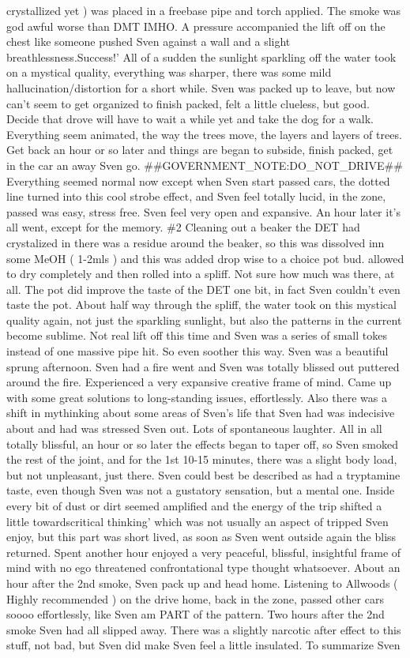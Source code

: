 \documentclass[12pt]{book}
\begin{document}
crystallized yet ) was placed in a freebase pipe and torch applied. The smoke was god awful worse than DMT IMHO. A pressure accompanied the lift off on the chest like someone pushed Sven against a wall and a slight breathlessness.Success!' All of a sudden the sunlight sparkling off the water took on a mystical quality, everything was sharper, there was some mild hallucination/distortion for a short while. Sven was packed up to leave, but now can't seem to get organized to finish packed, felt a little clueless, but good. Decide that drove will have to wait a while yet and take the dog for a walk. Everything seem animated, the way the trees move, the layers and layers of trees. Get back an hour or so later and things are began to subside, finish packed, get in the car an away Sven go. \#\#GOVERNMENT\_NOTE:DO\_NOT\_DRIVE\#\# Everything seemed normal now except when Sven start passed cars, the dotted line turned into this cool strobe effect, and Sven feel totally lucid, in the zone, passed was easy, stress free. Sven feel very open and expansive. An hour later it's all went, except for the memory. \#2 Cleaning out a beaker the DET had crystalized in there was a residue around the beaker, so this was dissolved inn some MeOH ( 1-2mls ) and this was added drop wise to a choice pot bud. allowed to dry completely and then rolled into a spliff. Not sure how much was there, at all. The pot did improve the taste of the DET one bit, in fact Sven couldn't even taste the pot. About half way through the spliff, the water took on this mystical quality again, not just the sparkling sunlight, but also the patterns in the current become sublime. Not real lift off this time and Sven was a series of small tokes instead of one massive pipe hit. So even soother this way. Sven was a beautiful sprung afternoon. Sven had a fire went and Sven was totally blissed out puttered around the fire. Experienced a very expansive creative frame of mind. Came up with some great solutions to long-standing issues, effortlessly. Also there was a shift in mythinking about some areas of Sven's life that Sven had was indecisive about and had was stressed Sven out. Lots of spontaneous laughter. All in all totally blissful, an hour or so later the effects began to taper off, so Sven smoked the rest of the joint, and for the 1st 10-15 minutes, there was a slight body load, but not unpleasant, just there. Sven could best be described as had a tryptamine taste, even though Sven was not a gustatory sensation, but a mental one. Inside every bit of dust or dirt seemed amplified and the energy of the trip shifted a little towardscritical thinking' which was not usually an aspect of tripped Sven enjoy, but this part was short lived, as soon as Sven went outside again the bliss returned. Spent another hour enjoyed a very peaceful, blissful, insightful frame of mind with no ego threatened confrontational type thought whatsoever. About an hour after the 2nd smoke, Sven pack up and head home. Listening to Allwoods ( Highly recommended ) on the drive home, back in the zone, passed other cars soooo effortlessly, like Sven am PART of the pattern. Two hours after the 2nd smoke Sven had all slipped away. There was a slightly narcotic after effect to this stuff, not bad, but Sven did make Sven feel a little insulated. To summarize Sven 
\end{document}
